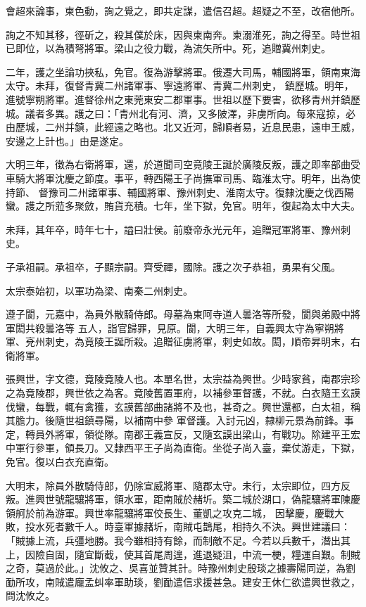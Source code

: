 \begin{pinyinscope}
 會超來論事，柬色動，詢之覺之，即共定謀，遣信召超。超疑之不至，改宿他所。



 詢之不知其移，徑斫之，殺其僕於床，因與柬南奔。柬溺淮死，詢之得至。時世祖已即位，以為積弩將軍。梁山之役力戰，為流矢所中。死，追贈冀州刺史。



 二年，護之坐論功挾私，免官。復為游擊將軍。俄遷大司馬，輔國將軍，領南東海太守。未拜，復督青冀二州諸軍事、寧遠將軍、青冀二州刺史，
 鎮歷城。明年，進號寧朔將軍。進督徐州之東莞東安二郡軍事。世祖以歷下要害，欲移青州并鎮歷城。議者多異。護之曰：「青州北有河、濟，又多陂澤，非虜所向。每來寇掠，必由歷城，二州并鎮，此經遠之略也。北又近河，歸順者易，近息民患，遠申王威，安邊之上計也。」由是遂定。



 大明三年，徵為右衛將軍，還，於道聞司空竟陵王誕於廣陵反叛，護之即率部曲受車騎大將軍沈慶之節度。事平，轉西陽王子尚撫軍司馬、臨淮太守。明年，出為使持節、
 督豫司二州諸軍事、輔國將軍、豫州刺史、淮南太守。復隸沈慶之伐西陽蠻。護之所蒞多聚斂，賄貨充積。七年，坐下獄，免官。明年，復起為太中大夫。



 未拜，其年卒，時年七十，謚曰壯侯。前廢帝永光元年，追贈冠軍將軍、豫州刺史。



 子承祖嗣。承祖卒，子顯宗嗣。齊受禪，國除。護之次子恭祖，勇果有父風。



 太宗泰始初，以軍功為梁、南秦二州刺史。



 遵子閬，元嘉中，為員外散騎侍郎。母墓為東阿寺道人曇洛等所發，閬與弟殿中將軍閎共殺曇洛等
 五人，詣官歸罪，見原。閬，大明三年，自義興太守為寧朔將軍、兗州刺史，為竟陵王誕所殺。追贈征虜將軍，刺史如故。閎，順帝昇明末，右衛將軍。



 張興世，字文德，竟陵竟陵人也。本單名世，太宗益為興世。少時家貧，南郡宗珍之為竟陵郡，興世依之為客。竟陵舊置軍府，以補參軍督護，不就。白衣隨王玄謨伐蠻，每戰，輒有禽獲，玄謨舊部曲諸將不及也，甚奇之。興世還都，白太祖，稱其膽力。後隨世祖鎮尋陽，以補南中參
 軍督護。入討元凶，隸柳元景為前鋒。事定，轉員外將軍，領從隊。南郡王義宣反，又隨玄謨出梁山，有戰功。除建平王宏中軍行參軍，領長刀。又隸西平王子尚為直衛。坐從子尚入臺，棄仗游走，下獄，免官。復以白衣充直衛。



 大明末，除員外散騎侍郎，仍除宣威將軍、隨郡太守。未行，太宗即位，四方反叛。進興世號龍驤將軍，領水軍，距南賊於赭圻。築二城於湖口，偽龍驤將軍陳慶領舸於前為游軍。興世率龍驤將軍佼長生、董凱之攻克二城，
 因擊慶，慶戰大敗，投水死者數千人。時臺軍據赭圻，南賊屯鵲尾，相持久不決。興世建議曰：「賊據上流，兵彊地勝。我今雖相持有餘，而制敵不足。今若以兵數千，潛出其上，因險自固，隨宜斷截，使其首尾周遑，進退疑沮，中流一梗，糧運自艱。制賊之奇，莫過於此。」沈攸之、吳喜並贊其計。時豫州刺史殷琰之據壽陽同逆，為劉勔所攻，南賊遣龐孟虯率軍助琰，劉勔遣信求援甚急。建安王休仁欲遣興世救之，問沈攸之。




\end{pinyinscope}
